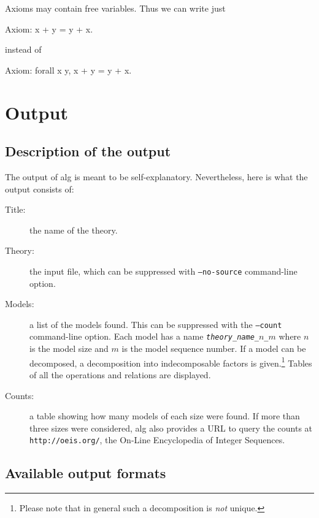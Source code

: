 \documentclass{article}
\begin{document}
Axioms may contain free variables. Thus we can write just
%
\begin{source}
Axiom: x + y = y + x.
\end{source}
%
instead of
\begin{source}
Axiom: forall x y, x + y = y + x.
\end{source}
%

\section{Output}
\label{sec:output-files}

\subsection{Description of the output}
\label{sec:description-output}

The output of alg is meant to be self-explanatory. Nevertheless, here
is what the output consists of:
%
\begin{description}
\item[Title:] the name of the theory.
\item[Theory:] the input file, which can be suppressed with %
  \texttt{--no-source} command-line option.
\item[Models:] a list of the models found. This can be
  suppressed with the \texttt{--count} command-line option. Each model
  has a name \texttt{\textit{theory\_name\_$n$\_$m$}}
  where $n$ is the model size and $m$ is the model sequence number. If
  a model can be decomposed, a decomposition into indecomposable
  factors is given.\footnote{Please note that in general such a
    decomposition is \emph{not} unique.} Tables of all the operations
  and relations are displayed.
\item[Counts:] a table showing how many models of each size were found.
  If more than three sizes were considered, alg also provides a URL to
  query the counts at \texttt{http://oeis.org/}, the On-Line
  Encyclopedia of Integer Sequences.
\end{description}

\subsection{Available output formats}
\label{sec:output-formats}
\end{document}

